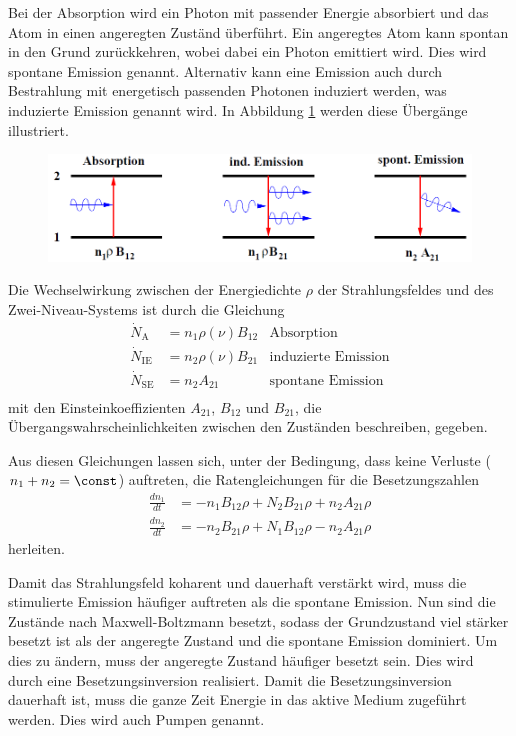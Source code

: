 \documentclass[]{scrartcl}
\begin{document}
Bei der Absorption wird ein Photon mit passender Energie absorbiert und das Atom in einen angeregten Zuständ überführt. 
Ein angeregtes Atom kann spontan in den Grund zurückkehren, wobei dabei ein Photon emittiert wird. Dies wird spontane Emission genannt.
Alternativ kann eine Emission auch durch Bestrahlung mit energetisch passenden Photonen induziert werden, was induzierte Emission genannt wird.
In Abbildung \ref{fig:schema_uebergaenge} werden diese Übergänge illustriert.

\begin{figure}[h]
 \centering
 \includegraphics[]{images/schema_uebergaenge.png}
\label{fig:schema_uebergaenge}
\end{figure}

Die Wechselwirkung zwischen der Energiedichte $\rho$ der Strahlungsfeldes und des Zwei-Niveau-Systems ist durch die Gleichung
\begin{align}
 \dot{N}_\text{A}   & =n_1 \rho\left(\nu \right)B_{12}  &\text{Absorption} \\
 \dot{N}_\text{IE}  & =n_2 \rho\left(\nu \right)B_{21}  &\text{induzierte Emission} \\
 \dot{N}_\text{SE}  & =n_2 A_{21}                       &\text{spontane Emission} \\
\end{align}
mit den Einsteinkoeffizienten $A_{21}$, $B_{12}$ und $B_{21}$, die Übergangswahrscheinlichkeiten zwischen den Zuständen beschreiben, gegeben.

Aus diesen Gleichungen lassen sich, unter der Bedingung, dass keine Verluste ($n_1+n_2=\const$) auftreten, die Ratengleichungen für die Besetzungszahlen
\begin{align}
 \frac{d n_1}{d t}&=-n_1B_{12}\rho+N_2B_{21}\rho+n_2A_{21}\rho \\
 \frac{d n_2}{d t}&=-n_2B_{21}\rho+N_1B_{12}\rho-n_2A_{21}\rho
\end{align}
herleiten.

Damit das Strahlungsfeld koharent und dauerhaft verstärkt wird, muss die stimulierte Emission häufiger auftreten als die spontane Emission. 
Nun sind die Zustände nach Maxwell-Boltzmann besetzt, sodass der Grundzustand viel stärker besetzt ist als der angeregte Zustand und die spontane Emission dominiert.
Um dies zu ändern, muss der angeregte Zustand häufiger besetzt sein. Dies wird durch eine Besetzungsinversion realisiert. 
Damit die Besetzungsinversion dauerhaft ist, muss die ganze Zeit Energie in das aktive Medium zugeführt werden. Dies wird auch Pumpen genannt.
\end{document}
